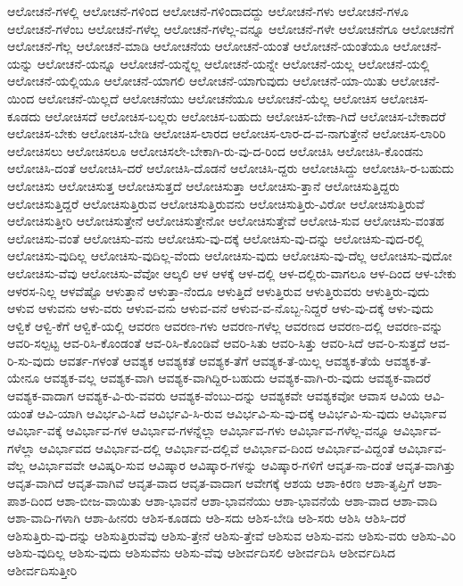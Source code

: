 {ಆಲೋಚನೆ-ಗಳಲ್ಲಿ
ಆಲೋಚನೆ-ಗಳಿಂದ
ಆಲೋಚನೆ-ಗಳಿಂದಾದದ್ದು
ಆಲೋಚನೆ-ಗಳು
ಆಲೋಚನೆ-ಗಳೂ
ಆಲೋಚನೆ-ಗಳೆಂಬ
ಆಲೋಚನೆ-ಗಳೆಲ್ಲ
ಆಲೋಚನೆ-ಗಳೆಲ್ಲ-ವನ್ನೂ
ಆಲೋಚನೆ-ಗಳೇ
ಆಲೋಚನೆಗೂ
ಆಲೋಚನೆಗೆ
ಆಲೋಚನೆ-ಗೆಲ್ಲ
ಆಲೋಚನೆ-ಮಾಡಿ
ಆಲೋಚನೆಯ
ಆಲೋಚನೆ-ಯಂತೆ
ಆಲೋಚನೆ-ಯಂತೆಯೂ
ಆಲೋಚನೆ-ಯನ್ನು
ಆಲೋಚನೆ-ಯನ್ನೂ
ಆಲೋಚನೆ-ಯನ್ನೆಲ್ಲ
ಆಲೋಚನೆ-ಯನ್ನೇ
ಆಲೋಚನೆ-ಯಲ್ಲ
ಆಲೋಚನೆ-ಯಲ್ಲಿ
ಆಲೋಚನೆ-ಯಲ್ಲಿಯೂ
ಆಲೋಚನೆ-ಯಾಗಲಿ
ಆಲೋಚನೆ-ಯಾಗುವುದು
ಆಲೋಚನೆ-ಯಾ-ಯಿತು
ಆಲೋಚನೆ-ಯಿಂದ
ಆಲೋಚನೆ-ಯಿಲ್ಲದೆ
ಆಲೋಚನೆಯು
ಆಲೋಚನೆಯೂ
ಆಲೋಚನೆ-ಯೆಲ್ಲ
ಆಲೋಚಿಸ
ಆಲೋಚಿಸ-ಕೂಡದು
ಆಲೋಚಿಸದೆ
ಆಲೋಚಿಸ-ಬಲ್ಲರು
ಆಲೋಚಿಸ-ಬಹುದು
ಆಲೋಚಿಸ-ಬೇಕಾ-ಗಿದೆ
ಆಲೋಚಿಸ-ಬೇಕಾದರೆ
ಆಲೋಚಿಸ-ಬೇಕು
ಆಲೋಚಿಸ-ಬೇಡಿ
ಆಲೋಚಿಸ-ಲಾರದ
ಆಲೋಚಿಸ-ಲಾರ-ದ-ವ-ನಾಗುತ್ತೇನೆ
ಆಲೋಚಿಸ-ಲಾರಿರಿ
ಆಲೋಚಿಸಲು
ಆಲೋಚಿಸಲೂ
ಆಲೋಚಿಸಲೇ-ಬೇಕಾಗಿ-ರು-ವು-ದ-ರಿಂದ
ಆಲೋಚಿಸಿ
ಆಲೋಚಿಸಿ-ಕೊಂಡನು
ಆಲೋಚಿಸಿ-ದಂತೆ
ಆಲೋಚಿಸಿ-ದರೆ
ಆಲೋಚಿಸಿ-ದೊಡನೆ
ಆಲೋಚಿಸಿ-ದ್ದರು
ಆಲೋಚಿಸಿದ್ದು
ಆಲೋಚಿಸಿ-ರ-ಬಹುದು
ಆಲೋಚಿಸು
ಆಲೋಚಿಸುತ್ತ
ಆಲೋಚಿಸುತ್ತದೆ
ಆಲೋಚಿಸುತ್ತಾ
ಆಲೋಚಿಸು-ತ್ತಾನೆ
ಆಲೋಚಿಸುತ್ತಿದ್ದರು
ಆಲೋಚಿಸುತ್ತಿದ್ದರೆ
ಆಲೋಚಿಸುತ್ತಿರುವ
ಆಲೋಚಿಸುತ್ತಿರುವನು
ಆಲೋಚಿಸುತ್ತಿರು-ವಿರೋ
ಆಲೋಚಿಸುತ್ತಿರುವೆ
ಆಲೋಚಿಸುತ್ತೀರಿ
ಆಲೋಚಿಸುತ್ತೇನೆ
ಆಲೋಚಿಸುತ್ತೇನೋ
ಆಲೋಚಿಸುತ್ತೇವೆ
ಆಲೋಚಿ-ಸುವ
ಆಲೋಚಿಸು-ವಂತಹ
ಆಲೋಚಿಸು-ವಂತೆ
ಆಲೋಚಿಸು-ವನು
ಆಲೋಚಿಸು-ವು-ದಕ್ಕೆ
ಆಲೋಚಿಸು-ವು-ದನ್ನು
ಆಲೋಚಿಸು-ವುದ-ರಲ್ಲಿ
ಆಲೋಚಿಸು-ವುದಿಲ್ಲ
ಆಲೋಚಿಸು-ವುದಿಲ್ಲ-ವೆಂದು
ಆಲೋಚಿಸು-ವುದು
ಆಲೋಚಿಸು-ವು-ದೆಲ್ಲ
ಆಲೋಚಿಸು-ವುದೋ
ಆಲೋಚಿಸು-ವೆವು
ಆಲೋಚಿಸು-ವೆವೋ
ಆಲ್ಕಲಿ
ಆಳ
ಆಳಕ್ಕೆ
ಆಳ-ದಲ್ಲಿ
ಆಳ-ದಲ್ಲಿರು-ವಾಗಲೂ
ಆಳ-ದಿಂದ
ಆಳ-ಬೇಕು
ಆಳರಸ-ನಿಲ್ಲ
ಆಳವೆಷ್ಟೊ
ಆಳುತ್ತಾನೆ
ಆಳುತ್ತಾ-ನೆಂದೂ
ಆಳುತ್ತಿದೆ
ಆಳುತ್ತಿರುವ
ಆಳುತ್ತಿರುವರು
ಆಳುತ್ತಿರು-ವುದು
ಆಳುವ
ಆಳುವನು
ಆಳು-ವರು
ಆಳುವ-ವನು
ಆಳುವ-ವನೆ
ಆಳುವ-ವ-ನೊಬ್ಬ-ನಿದ್ದರೆ
ಆಳು-ವು-ದಕ್ಕೆ
ಆಳು-ವುದು
ಆಳ್ವಿಕೆ
ಆಳ್ವಿ-ಕೆಗೆ
ಆಳ್ವಿಕೆ-ಯಲ್ಲಿ
ಆವರಣ
ಆವರಣ-ಗಳು
ಆವರಣ-ಗಳೆಲ್ಲ
ಆವರಣದ
ಆವರಣ-ದಲ್ಲಿ
ಆವರಣ-ವನ್ನು
ಆವರಿ-ಸಲ್ಪಟ್ಟ
ಆವ-ರಿಸಿ-ಕೊಂಡಂತೆ
ಆವ-ರಿಸಿ-ಕೊಂಡಿವೆ
ಆವರಿ-ಸಿತು
ಆವರಿ-ಸಿತ್ತು
ಆವರಿ-ಸಿದೆ
ಆವ-ರಿ-ಸುತ್ತದೆ
ಆವ-ರಿ-ಸು-ವುದು
ಆವರ್ತ-ಗಳಂತೆ
ಆವಶ್ಯಕ
ಆವಶ್ಯಕತೆ
ಆವಶ್ಯಕ-ತೆಗೆ
ಆವಶ್ಯಕ-ತೆ-ಯಿಲ್ಲ
ಆವಶ್ಯಕ-ತೆಯೆ
ಆವಶ್ಯಕ-ತೆ-ಯೇನೂ
ಆವಶ್ಯಕ-ವಲ್ಲ
ಆವಶ್ಯಕ-ವಾಗಿ
ಆವಶ್ಯಕ-ವಾಗಿದ್ದಿರ-ಬಹುದು
ಆವಶ್ಯಕ-ವಾಗಿ-ರು-ವುದು
ಆವಶ್ಯಕ-ವಾದರೆ
ಆವಶ್ಯಕ-ವಾದಾಗ
ಆವಶ್ಯಕ-ವಿ-ರು-ವವರು
ಆವಶ್ಯಕ-ವೆಂಬು-ದನ್ನು
ಆವಶ್ಯಕವೇ
ಆವಶ್ಯಕವೋ
ಆವಾಸ
ಆವಿಯ
ಆವಿ-ಯಂತೆ
ಆವಿ-ಯಾಗಿ
ಆವಿರ್ಭವಿ-ಸಿದೆ
ಆವಿರ್ಭವಿ-ಸಿ-ರುವ
ಆವಿರ್ಭವಿ-ಸು-ವು-ದಕ್ಕೆ
ಆವಿರ್ಭವಿ-ಸು-ವುದು
ಆವಿರ್ಭಾವ
ಆವಿರ್ಭಾ-ವಕ್ಕೆ
ಆವಿರ್ಭಾವ-ಗಳ
ಆವಿರ್ಭಾವ-ಗಳನ್ನೆಲ್ಲಾ
ಆವಿರ್ಭಾವ-ಗಳು
ಆವಿರ್ಭಾವ-ಗಳೆಲ್ಲ-ವನ್ನೂ
ಆವಿರ್ಭಾವ-ಗಳೆಲ್ಲಾ
ಆವಿರ್ಭಾವದ
ಆವಿರ್ಭಾವ-ದಲ್ಲಿ
ಆವಿರ್ಭಾವ-ದಲ್ಲಿವೆ
ಆವಿರ್ಭಾವ-ದಿಂದ
ಆವಿರ್ಭಾವ-ವಿದ್ದಂತೆ
ಆವಿರ್ಭಾವ-ವೆಲ್ಲ
ಆವಿರ್ಭಾವವೇ
ಆವಿಷ್ಕರಿ-ಸುವ
ಆವಿಷ್ಕಾರ
ಆವಿಷ್ಕಾರ-ಗಳನ್ನು
ಆವಿಷ್ಕಾರ-ಗಳಿಗೆ
ಆವೃತ-ನಾ-ದಂತೆ
ಆವೃತ-ವಾಗಿತ್ತು
ಆವೃತ-ವಾಗಿದೆ
ಆವೃತ-ವಾಗಿವೆ
ಆವೃತ-ವಾದ
ಆವೃತ-ವಾದಾಗ
ಆವೇಗಕ್ಕೆ
ಆಶಯ
ಆಶಾ-ಕಿರಣ
ಆಶಾ-ತೃಪ್ತಿಗೆ
ಆಶಾ-ಪಾಶ-ದಿಂದ
ಆಶಾ-ಬೀಜ-ವಾಯಿತು
ಆಶಾ-ಭಾವನೆ
ಆಶಾ-ಭಾವನೆಯು
ಆಶಾ-ಭಾವನೆಯೆ
ಆಶಾ-ವಾದ
ಆಶಾ-ವಾದಿ
ಆಶಾ-ವಾದಿ-ಗಳಾಗಿ
ಆಶಾ-ಹೀನರು
ಆಶಿಸ-ಕೂಡದು
ಆಶಿ-ಸದು
ಆಶಿಸ-ಬೇಡಿ
ಆಶಿ-ಸರು
ಆಶಿಸಿ
ಆಶಿಸಿ-ದರೆ
ಆಶಿಸುತ್ತಿರು-ವು-ದನ್ನು
ಆಶಿಸುತ್ತಿರುವೆವು
ಆಶಿಸು-ತ್ತೇನೆ
ಆಶಿಸು-ತ್ತೇವೆ
ಆಶಿಸುವ
ಆಶಿಸು-ವನು
ಆಶಿಸು-ವರು
ಆಶಿಸು-ವಿರಿ
ಆಶಿಸು-ವುದಿಲ್ಲ
ಆಶಿಸು-ವುದು
ಆಶಿಸುವೆನು
ಆಶಿಸು-ವೆವು
ಆಶೀರ್ವದಿಸಲಿ
ಆಶೀರ್ವದಿಸಿ
ಆಶೀರ್ವದಿಸಿದ
ಆಶೀರ್ವದಿಸುತ್ತೀರಿ
}
